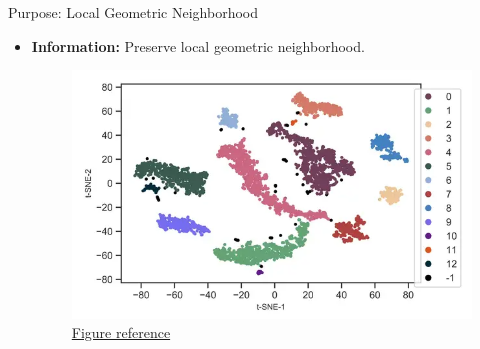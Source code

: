 \documentclass[serif, aspectratio=169]{beamer}
\begin{document}
\begin{frame}{Purpose: Local Geometric Neighborhood}
    \begin{itemize}
        \item \textbf{Information:} Preserve local geometric neighborhood.
        \begin{figure}[htpb]
                \begin{center}
                    \includegraphics[keepaspectratio, scale=0.5]{pic/local_relation.PNG}
                  \caption{\href{https://www.reneshbedre.com/blog/tsne.html}{Figure reference}}
                \end{center}
        \end{figure}
    \end{itemize}
\end{frame}
\end{document}
